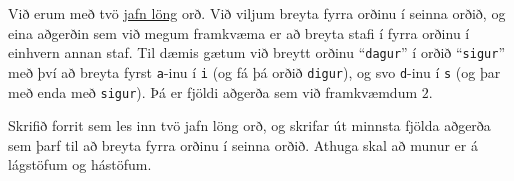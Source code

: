 \begin{problem}
	Við erum með tvö \underline{jafn löng} orð. Við viljum breyta fyrra orðinu í seinna orðið, og eina aðgerðin sem við megum framkvæma er að breyta stafi í fyrra orðinu í einhvern annan staf. Til dæmis gætum við breytt orðinu "`\texttt{dagur}"' í orðið "`\texttt{sigur}"' með því að breyta fyrst \texttt{a}-inu í \texttt{i} (og fá þá orðið \texttt{digur}), og svo \texttt{d}-inu í \texttt{s} (og þar með enda með \texttt{sigur}). Þá er fjöldi aðgerða sem við framkvæmdum $2$.

	Skrifið forrit sem les inn tvö jafn löng orð, og skrifar út minnsta fjölda aðgerða sem þarf til að breyta fyrra orðinu í seinna orðið. Athuga skal að munur er á lágstöfum og hástöfum.

\begin{example}
%
\end{example}
\begin{example}
%
\end{example}
\begin{example}
%
\end{example}
\begin{example}
%
\end{example}
\end{problem}